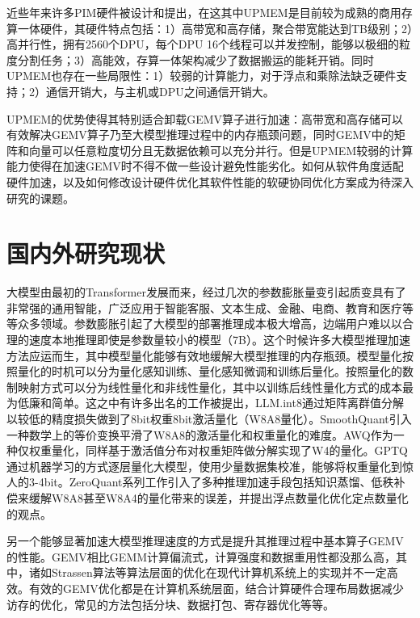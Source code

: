 近些年来许多PIM硬件被设计和提出\cite{SamsungHBMPIM,AxDIMM,AiM,AlibabaPIM,UPMEMHotChips}，在这其中UPMEM是目前较为成熟的商用存算一体硬件，其硬件特点包括：1）高带宽和高存储，聚合带宽能达到TB级别；2）高并行性，拥有2560个DPU，每个DPU 16个线程可以并发控制，能够以极细的粒度分割任务；3）高能效，存算一体架构减少了数据搬运的能耗开销。同时UPMEM也存在一些局限性：1）较弱的计算能力，对于浮点和乘除法缺乏硬件支持；2）通信开销大，与主机或DPU之间通信开销大。

UPMEM的优势使得其特别适合卸载GEMV算子进行加速：高带宽和高存储可以有效解决GEMV算子乃至大模型推理过程中的内存瓶颈问题，同时GEMV中的矩阵和向量可以任意粒度切分且无数据依赖可以充分并行。但是UPMEM较弱的计算能力使得在加速GEMV时不得不做一些设计避免性能劣化。如何从软件角度适配硬件加速，以及如何修改设计硬件优化其软件性能的软硬协同优化方案成为待深入研究的课题。

\section{国内外研究现状}
大模型由最初的Transformer\cite{Transformer}发展而来，经过几次的参数膨胀\cite{GPT-1,GPT-2,GPT-3}量变引起质变具有了非常强的通用智能，广泛应用于智能客服、文本生成、金融、电商、教育和医疗等等众多领域\cite{EdgeLLM}。参数膨胀引起了大模型的部署推理成本极大增高，边端用户难以以合理的速度本地推理即使是参数量较小的模型（7B）。这个时候许多大模型推理加速方法应运而生\cite{LLMInferSurveyTsingHua}，其中模型量化能够有效地缓解大模型推理的内存瓶颈\cite{ModelQuant}。模型量化按照量化的时机可以分为量化感知训练、量化感知微调和训练后量化。按照量化的数制映射方式可以分为线性量化和非线性量化，其中以训练后线性量化方式的成本最为低廉和简单。这之中有许多出名的工作被提出，LLM.int8\cite{LLMINT8}通过矩阵离群值分解以较低的精度损失做到了8bit权重8bit激活量化（W8A8量化）。SmoothQuant\cite{SmoothQuant}引入一种数学上的等价变换平滑了W8A8的激活量化和权重量化的难度。AWQ\cite{AWQ}作为一种仅权重量化，同样基于激活值分布对权重矩阵做分解实现了W4的量化。GPTQ\cite{GPTQ}通过机器学习的方式逐层量化大模型，使用少量数据集校准，能够将权重量化到惊人的3-4bit。ZeroQuant系列\cite{ZeroQuant1,ZeroQuant2,ZeroQuantFP}工作引入了多种推理加速手段包括知识蒸馏、低秩补偿来缓解W8A8甚至W8A4的量化带来的误差，并提出浮点数量化优化定点数量化的观点。

另一个能够显著加速大模型推理速度的方式是提升其推理过程中基本算子GEMV的性能\cite{InferLinear}。GEMV相比GEMM计算偏流式，计算强度和数据重用性都没那么高，其中，诸如Strassen算法\cite{Strassen}等算法层面的优化在现代计算机系统上的实现并不一定高效。有效的GEMV优化都是在计算机系统层面，结合计算硬件合理布局数据减少访存的优化\cite{GPUGEMV}，常见的方法包括分块、数据打包、寄存器优化等等。

